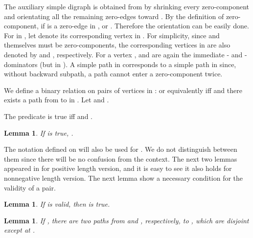 \documentclass[review]{elsarticle}
\def\squarebox#1{\hbox to #1{\hfill\vbox to #1{\vfill}}}
\renewcommand{\qed}{\hspace*{\fill}
            \vbox{\hrule\hbox{\vrule\squarebox{.667em}\vrule}\hrule}\smallskip\newline}
\newtheorem{lem}[thm]{Lemma}
\begin{document}
The auxiliary simple digraph  is obtained from  by
shrinking every zero-component and orientating all the remaining
zero-edges toward . By the definition of zero-component, if
 is a zero-edge in ,  or .
Therefore the orientation can be easily done. For  in ,
let  denote its corresponding vertex in . For
simplicity, since  and  themselves must be zero-components,
the corresponding vertices in  are also denoted by 
and , respectively. For a vertex ,  and 
are again the immediate - and -dominators (but in
). A simple path in  corresponds to a simple path
in  since, without backward subpath, a path cannot
enter a zero-component twice.

\begin{defi}
We define a binary relation on pairs of vertices in :
 or equivalently  iff  and there
exists a path from  to  in . Let  and .
\end{defi}

\begin{defi}
The predicate  is true iff  and .
\end{defi}

\begin{lem}\label{beta1a}
If  is true, .
\end{lem}


The notation defined on  will also be used for .
We do not distinguish between them since there will be no confusion
from the context. The next two lemmas appeared in \cite{wu10} for
positive length version, and it is easy to see it also holds for
nonnegative length version. The next lemma show a necessary
condition for the validity of a pair.
\begin{lem}\label{back_nec}
If  is valid, then  is true.
\end{lem}

\begin{lem}\label{close}
If , there are two paths from  and ,
respectively, to , which are  disjoint except at .
\end{lem}
\end{document}
